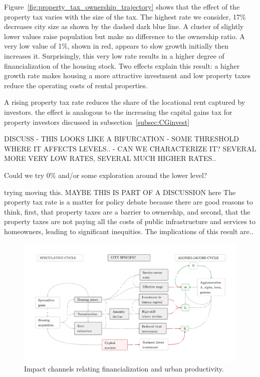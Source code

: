 Figure~\ref{fig:property_tax_ownership_trajectory} shows that the effect of the property tax varies with the size of the tax. The highest rate we consider, 17\%  decreases city size as shown by the dashed dark blue line. A cluster of slightly lower values raise population but make no difference to the ownership ratio. A very low value of 1\%, shown in red, appears to slow growth initially then increases it.  Surprisingly, this very low rate results in a higher degree of financialization of the housing stock. Two effects explain this result: a higher growth rate makes housing a more attractive investment and low property taxes reduce the operating costs of rental properties. 

A rising property tax rate reduces the share of the locational rent captured by investors. the effect is analogous to the  increasing the capital gains tax for property investors discussed in subsection~\ref{subsec:CGinvest}


{\color{red} DISCUSS - THIS LOOKS LIKE A BIFURCATION - SOME THRESHOLD WHERE IT AFFECTS LEVELS.. - CAN WE CHARACTERIZE IT? SEVERAL MORE VERY LOW RATES, SEVERAL MUCH HIGHER RATES..
 
Could we try 0\% and/or some exploration around the lower level?
}

{\color{red} trying moving this. MAYBE THIS IS PART OF A DISCUSSION here }
The property tax rate is a matter for policy debate because there are good reasons to think, first, that property taxes are a barrier to ownership, and second, that the property taxes are not paying all the costs of public infrastructure and services to homeowners, leading to significant inequities. The implications of this result are..


\begin{figure}[h!tb]\label{fig-impact-channels2}
\begin{adjustwidth}{-0.24\textwidth}{-0.24\textwidth}
\centering
\includegraphics[scale=.15 ]{fig/impact-channels.png}%
\end{adjustwidth}
\caption[Impact channels relating financialization and urban productivity]{Impact channels relating financialization and urban productivity.}
\end{figure}


